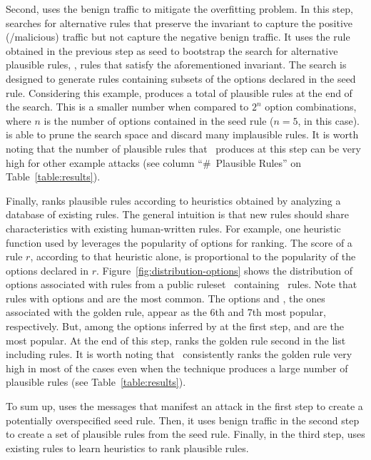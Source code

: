 \documentclass[sigconf,review, anonymous]{acmart}
\begin{document}
Second, \tname{} uses the benign traffic to mitigate the overfitting
problem. In this step, \tname{} searches for alternative rules that
preserve the invariant to capture the positive (/malicious) traffic
but not capture the negative benign traffic. It uses the rule obtained
in the previous step as seed to bootstrap the search for alternative
plausible rules, \ie{}, rules that satisfy the aforementioned
invariant. The search is designed to generate rules containing subsets
of the options declared in the seed rule. Considering this example,
\tname{} produces a total of \pingscanplausible{} plausible rules at
the end of the search. This is a smaller number when compared to $2^n$
option combinations, where $n$ is the number of options contained in
the seed rule ($n=5$, in this case). \tname{} is able to prune the
search space and discard many implausible rules. It is worth noting
that the number of plausible rules that \tname\ produces at this step
can be very high for other example attacks (see column ``\#~Plausible
Rules'' on Table~\ref{table:results}).

Finally, \tname{} ranks plausible rules according to heuristics
obtained by analyzing a database of existing rules. The general
intuition is that new rules should share characteristics with existing
human-written rules. For example, one heuristic function used by
\tname{} leverages the popularity of options for ranking.  The score
of a rule $r$, according to that heuristic alone, is proportional to
the popularity of the options declared in
$r$. Figure~\ref{fig:distribution-options} shows the distribution of
options associated with rules from a public
ruleset~\cite{emerging-threats-open} containing
\numrulessuri\ rules. Note that rules with options 
and  are the most common. The options  and
, the ones associated with the golden rule, appear as
the 6th and 7th most popular, respectively. But, among the options
inferred by \tname{} at the first step,  and
 are the most popular. At the end of this step, \tname{}
ranks the golden rule second in the list including
\pingscanplausible{} rules. It is worth noting that
\tname\ consistently ranks the golden rule very high in most of the
cases even when the technique produces a large number of plausible
rules (see Table~\ref{table:results}).

To sum up, \tname{} uses the messages that manifest an attack in the
first step to create a potentially overspecified seed rule. Then, it
uses benign traffic in the second step to create a set of plausible
rules from the seed rule. Finally, in the third step, \tname{} uses
existing rules to learn heuristics to rank plausible rules.
\end{document}
